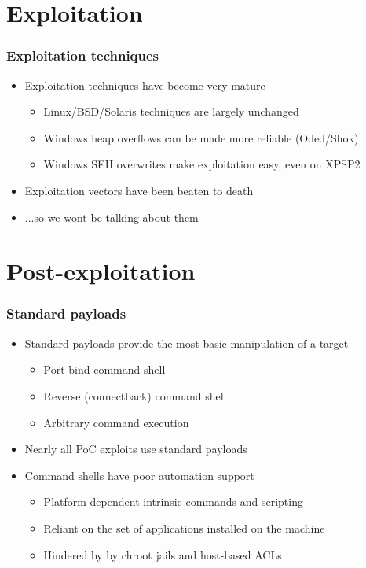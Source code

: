 \documentclass{beamer}
\newenvironment{sitemize}{\vspace{1mm}\begin{itemize}\itemsep 4pt\small}{\end{itemize}}
\begin{document}
\section{Exploitation}
\begin{frame}[t]
    \frametitle{Exploitation techniques}

    \begin{sitemize}
        \item Exploitation techniques have become very mature
        \begin{sitemize}
            \item Linux/BSD/Solaris techniques are largely unchanged
            \item Windows heap overflows can be made more reliable (Oded/Shok)
            \item Windows SEH overwrites make exploitation easy, even on XPSP2
        \end{sitemize}

        \pause
        \item Exploitation vectors have been beaten to death
        \pause
        \item ...so we wont be talking about them
    \end{sitemize}
\end{frame}

\section{Post-exploitation}
\begin{frame}[t]
    \frametitle{Standard payloads}

    \begin{sitemize}
        \item Standard payloads provide the most basic manipulation
        of a target
        \begin{sitemize}
            \item Port-bind command shell
            \item Reverse (connectback) command shell
            \item Arbitrary command execution
        \end{sitemize}

        \pause
        \item Nearly all PoC exploits use standard payloads

        \pause
        \item Command shells have poor automation support
        \begin{sitemize}
            \item Platform dependent intrinsic commands and
            scripting
            \item Reliant on the set of applications installed on the
            machine
            \item Hindered by by chroot jails and host-based ACLs
        \end{sitemize}
    \end{sitemize}
\end{frame}
\end{document}
